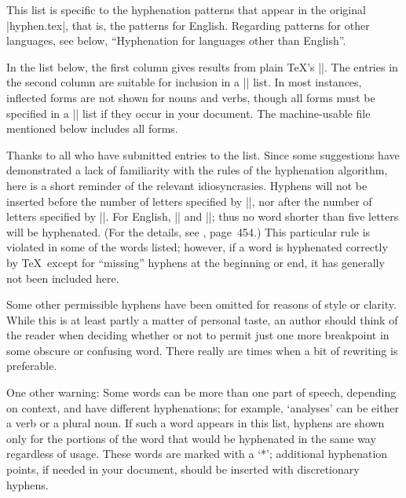 This list is specific to the hyphenation patterns that appear in
the original |hyphen.tex|, that is, the patterns for  English.
Regarding patterns for other languages, see below, ``Hyphenation for
languages other than  English''.

In the list below, the first column gives results from plain \TeX's
||. The entries in the second column are suitable for
inclusion in a \hbox{||} list.
In most instances, inflected forms are not shown for nouns and verbs,
though all forms must be specified in a || list
if they occur in your document. The machine-usable file mentioned below
includes all forms.

Thanks to all who have submitted entries to the list.  Since some
suggestions have demonstrated a lack of familiarity with the rules of
the hyphenation algorithm, here is a short reminder of the relevant
idiosyncrasies.  Hyphens will not be inserted before the number of
letters specified by |\lefthyphenmin|, nor after the number of letters
specified by |\righthyphenmin|.  For  English, ||
and ||; thus no word shorter than five
letters will be hyphenated.  (For the details, see \TB, page~454.)
This particular rule is violated in some of the words listed; however,
if a word is hyphenated correctly by \TeX\ except for ``missing''
hyphens at the beginning or end, it has generally not been included here.

Some other permissible hyphens have been omitted
for reasons of style or clarity.  While this is at
least partly a matter of personal taste, an author should think of the
reader when deciding whether or not to permit just one more breakpoint
in some obscure or confusing word.  There really are times when a bit of
rewriting is preferable.
{\hfuzz=2.2pt\par}

One other warning: Some words can be more than one part of speech,
depending on context, and have different hyphenations; for example,
`analyses' can be either a verb or a plural noun.  If such a word appears
in this list, hyphens are shown only for the portions of the word that
would be hyphenated in the same way regardless of usage.  These words
are marked with a `*'; additional hyphenation points, if needed in your
document, should be inserted with discretionary hyphens.

